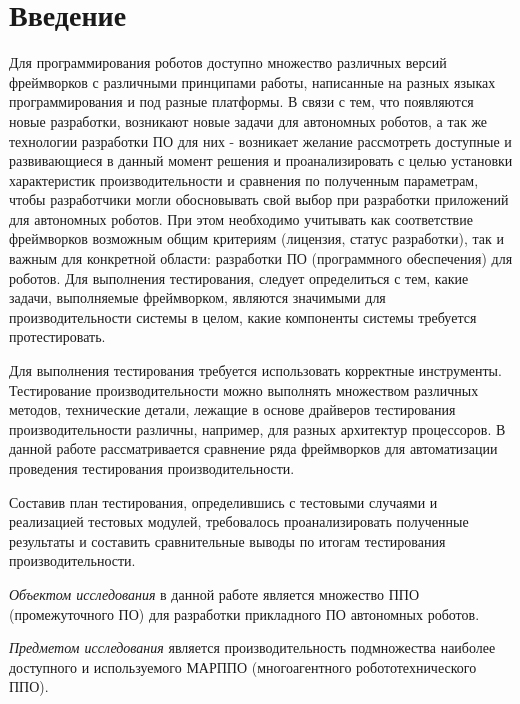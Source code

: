 \chapter*{Введение}

Для программирования роботов доступно множество различных версий фреймворков с различными принципами работы, написанные на разных языках программирования и под разные платформы. В связи с тем, что появляются новые разработки, возникают новые задачи для автономных роботов, а так же технологии разработки ПО для них - возникает желание рассмотреть доступные и развивающиеся в данный момент решения и проанализировать с целью установки характеристик производительности и сравнения по полученным параметрам, чтобы разработчики могли обосновывать свой выбор при разработки приложений для автономных роботов. При этом необходимо учитывать как соответствие фреймворков возможным общим критериям (лицензия, статус разработки), так и важным для конкретной области: разработки ПО (программного обеспечения) для роботов. Для выполнения тестирования, следует определиться с тем, какие задачи, выполняемые фреймворком, являются значимыми для производительности системы в целом, какие компоненты системы требуется протестировать.

Для выполнения тестирования требуется использовать корректные инструменты. Тестирование производительности можно выполнять множеством различных методов, технические детали, лежащие в основе драйверов тестирования производительности различны, например, для разных архитектур процессоров. В данной работе рассматривается сравнение ряда фреймворков для автоматизации проведения тестирования производительности.

Составив план тестирования, определившись с тестовыми случаями и реализацией тестовых модулей, требовалось проанализировать полученные результаты и составить сравнительные выводы по итогам тестирования производительности.

\textit{Объектом исследования} в данной работе является множество ППО (промежуточного ПО) для разработки прикладного ПО автономных роботов.

\textit{Предметом исследования} является производительность подмножества наиболее доступного и используемого МАРППО (многоагентного робототехнического ППО).

